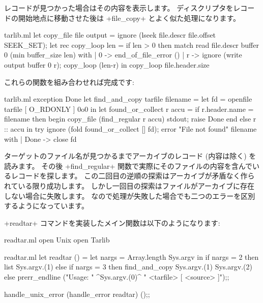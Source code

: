 レコードが見つかった場合はその内容を表示します。
ディスクリプタをレコードの開始地点に移動させた後は \ml+file_copy+ とよく似た処理になります。
\begin{listingcodefile}{tarlib.ml}
let copy_file file output =
  ignore (lseek file.descr file.offset SEEK_SET);
  let rec copy_loop len =
    if len > 0 then
      match read file.descr buffer 0 (min buffer_size len) with
      | 0 -> end_of_file_error ()
      | r -> ignore (write output buffer 0 r); copy_loop (len-r) in
  copy_loop file.header.size
\end{listingcodefile}
これらの関数を組み合わせれば完成です:
\begin{listingcodefile}{tarlib.ml}
exception Done
let find_and_copy tarfile filename =
  let fd = openfile tarfile [ O_RDONLY ] 0o0 in
  let found_or_collect r accu =
    if r.header.name = filename then begin
      copy_file (find_regular r accu) stdout;
      raise Done
    end else r :: accu in
  try
     ignore (fold found_or_collect [] fd);
     error "File not found" filename
  with
  | Done -> close fd
\end{listingcodefile}
ターゲットのファイル名が見つかるまでアーカイブのレコード (内容は除く) を読みます。
その後 \ml+find_regular+ 関数で実際にそのファイルの内容を含んでいるレコードを探します。
この二回目の逆順の探索はアーカイブが矛盾なく作られている限り成功します。
しかし一回目の探索はファイルがアーカイブに存在しない場合に失敗します。
なので処理が失敗した場合でも二つのエラーを区別するようになっています。

\ml+readtar+ コマンドを実装したメイン関数は以下のようになります:
\begin{codefile}{readtar.ml}
open Unix
open Tarlib
\end{codefile}
\begin{listingcodefile}{readtar.ml}
let readtar () =
  let nargs = Array.length Sys.argv in
  if nargs = 2 then list Sys.argv.(1)
  else if nargs = 3 then find_and_copy Sys.argv.(1) Sys.argv.(2)
  else
    prerr_endline ("Usage: " ^Sys.argv.(0)^ " <tarfile> [ <source> ]");;

handle_unix_error (handle_error readtar) ();;
\end{listingcodefile}

